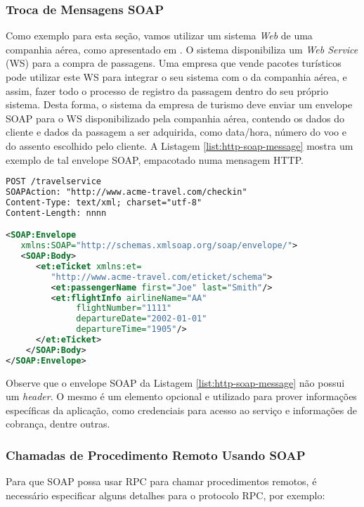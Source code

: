\subsubsection{Troca de Mensagens SOAP}

Como exemplo para esta seção, vamos utilizar um sistema \textit{Web} de uma companhia aérea, como apresentado em \cite{curbera2002unraveling}.
O sistema disponibiliza um \textit{Web Service} (WS) para a compra de passagens. Uma empresa que vende pacotes turísticos
pode utilizar este WS para integrar o seu sistema com o da companhia aérea,
e assim, fazer todo o processo de registro da passagem dentro do seu próprio sistema.
Desta forma, o sistema da empresa de turismo deve enviar um envelope SOAP
para o WS disponibilizado pela companhia aérea, contendo os dados do cliente
e dados da passagem a ser adquirida, como data/hora, número do voo e do assento 
escolhido pelo cliente. A Listagem \ref{list:http-soap-message} mostra um exemplo
de tal envelope SOAP, empacotado numa mensagem HTTP.

\begin{lstlisting}[language=xml]
POST /travelservice
SOAPAction: "http://www.acme-travel.com/checkin"
Content-Type: text/xml; charset="utf-8"
Content-Length: nnnn

<SOAP:Envelope 
   xmlns:SOAP="http://schemas.xmlsoap.org/soap/envelope/">
   <SOAP:Body>
      <et:eTicket xmlns:et=
         "http://www.acme-travel.com/eticket/schema">
         <et:passengerName first="Joe" last="Smith"/>
         <et:flightInfo airlineName="AA"
              flightNumber="1111"
              departureDate="2002-01-01"
              departureTime="1905"/>
      </et:eTicket>
    </SOAP:Body>
</SOAP:Envelope>
\end{lstlisting}

Observe que o envelope SOAP da Listagem \ref{list:http-soap-message} não possui um \textit{header}.
O mesmo é um elemento opcional e utilizado para prover informações específicas da aplicação,
como credenciais para acesso ao serviço e informações de cobrança, dentre outras\cite{soap-tutorial}.

\subsubsection{Chamadas de Procedimento Remoto Usando SOAP}

Para que SOAP possa usar RPC para chamar procedimentos remotos, é necessário
especificar alguns detalhes para o protocolo RPC, por exemplo:

